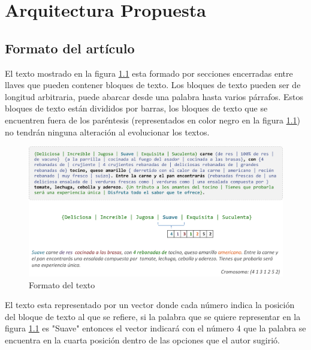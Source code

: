 
\chapter{Arquitectura Propuesta}

\section{Formato del artículo}

El texto mostrado en la figura \ref{formato} esta formado por secciones encerradas entre llaves que pueden contener  bloques de texto. Los bloques de texto pueden ser de longitud arbitraria, puede abarcar desde una palabra hasta varios párrafos. Estos bloques de texto están divididos por barras, los bloques de texto que se encuentren fuera de los paréntesis (representados en color negro en la figura \ref{formato}) no tendrán ninguna alteración al evolucionar los textos.

\begin{figure}[htp]
  \centerline{\includegraphics[width=6in]{formato.png}} 
  \caption{Formato del texto} 
\label{formato}
\end{figure}


El texto esta representado por un vector donde cada número indica la posición del bloque de texto al que se refiere, si la palabra que se quiere representar en la figura \ref{formato} es "Suave" entonces el vector indicará con el número 4 que la palabra se encuentra en la cuarta posición dentro de las opciones que el autor sugirió.


